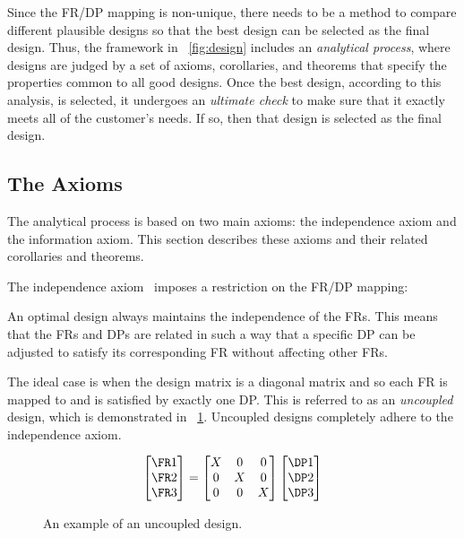 Since the FR/DP mapping is non-unique, there needs to be a method to compare different plausible designs so that
the best design can be selected as the final design.  Thus, the framework in \figurename~\ref{fig:design} includes
an \emph{analytical process}, where designs are judged by a set of axioms, corollaries, and theorems that specify
the properties common to all good designs.  Once the best design, according to this analysis, is selected, it
undergoes an \emph{ultimate check} to make sure that it exactly meets all of the customer's needs.  If so, then
that design is selected as the final design.

\subsection{The Axioms}\label{sec:sub:axioms}

The analytical process is based on two main axioms: the independence axiom and the information axiom.  This section
describes these axioms and their related corollaries and theorems.

The independence axiom~\cite{suh} imposes a restriction on the FR/DP mapping:

\begin{axiom}
  \label{axm:independence}
  An optimal design always maintains the independence of the FRs.  This means that the FRs and DPs are related in
  such a way that a specific DP can be adjusted to satisfy its corresponding FR without affecting other FRs.
\end{axiom}

The ideal case is when the design matrix is a diagonal matrix and so each FR is mapped to and is satisfied by
exactly one DP.  This is referred to as an \emph{uncoupled} design, which is demonstrated in
\figurename~\ref{fig:uncoupled}.  Uncoupled designs completely adhere to the independence axiom.

\begin{figure}[H]
  \begin{equation*}
    \begin{bmatrix}
      \FR1 \\ \FR2 \\ \FR3
    \end{bmatrix}=\begin{bmatrix}
    X & 0 & 0 \\
    0 & X & 0 \\
    0 & 0 & X
    \end{bmatrix}\begin{bmatrix}
      \DP1 \\ \DP2 \\ \DP3
    \end{bmatrix}
  \end{equation*}
  \vspace{-\baselineskip}
  \caption{An example of an uncoupled design.}
  \label{fig:uncoupled}
\end{figure}

